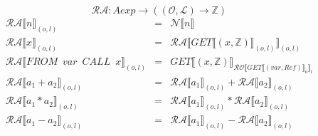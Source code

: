 \documentclass[12pt]{article}
\newcommand{\RA}{\mathcal{RA}}
\newcommand{\RO}{\mathcal{RO}}
\begin{document}
\[ \RA : Aexp \rightarrow ((\mathcal{O}, \mathcal{L}) \rightarrow \mathds{Z} ) \]
\[
\begin{matrix}
\RA\llbracket n \rrbracket_{(o,l)} & = & \mathcal{N}\llbracket n \rrbracket\\
\RA\llbracket x \rrbracket_{(o,l)} & = & \RA\llbracket GET\llbracket (x,\mathds{Z}) \rrbracket_{(o,l)} \rrbracket_{(o,l)}\\
\RA\llbracket FROM \enspace var \enspace CALL \enspace x \rrbracket_{(o,l)} & = & GET\llbracket (x,\mathds{Z}) \rrbracket_{\RO \llbracket GET\llbracket (var,Ref) \rrbracket_o \rrbracket_l }\\
\RA\llbracket a_1 + a_2 \rrbracket_{(o,l)} & = & \RA\llbracket a_1 \rrbracket_{(o,l)} + \RA\llbracket a_2 \rrbracket_{(o,l)}\\
\RA\llbracket a_1 * a_2 \rrbracket_{(o,l)} & = & \RA\llbracket a_1 \rrbracket_{(o,l)} * \RA\llbracket a_2 \rrbracket_{(o,l)}\\
\RA\llbracket a_1 - a_2 \rrbracket_{(o,l)}& = & \RA\llbracket a_1 \rrbracket_{(o,l)} - \RA\llbracket a_2 \rrbracket_{(o,l)}\\
\end{matrix}
\]
\end{document}
